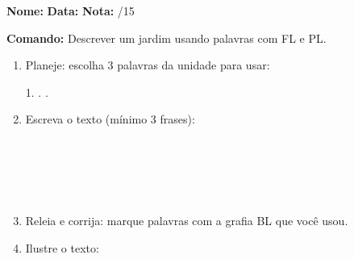 

\begin{exercicio}

\noindent\textbf{Nome:} \underline{\hspace{3.2cm}} \quad \textbf{Data:} \underline{\hspace{1.6cm}} \quad \textbf{Nota:} \underline{\hspace{0.9cm}}/15


\noindent\textbf{Comando:} Descrever um jardim usando palavras com FL e PL.


\begin{enumerate}

  \item Planeje: escolha 3 palavras da unidade para usar:
  \begin{center}
  1. \underline{\hspace{3cm}} . \underline{\hspace{3cm}} . \underline{\hspace{3cm}}
  \end{center}

  \item Escreva o texto (mínimo 3 frases):
  \begin{center}
  \underline{\hspace{12cm}}\\\underline{\hspace{12cm}}\\\underline{\hspace{12cm}}\\\underline{\hspace{12cm}}\\\underline{\hspace{12cm}}
  \end{center}

  \item Releia e corrija: marque palavras com a grafia BL que você usou.

  \item Ilustre o texto:
  \begin{center}
  \end{center}

\end{enumerate}

\end{exercicio}

